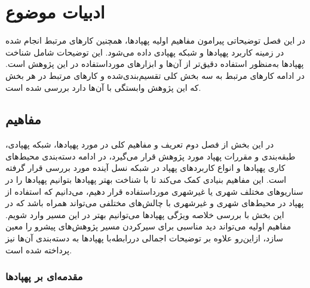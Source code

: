 \chapter{ادبیات موضوع}\label{Chapter2}
در این فصل توضیحاتی پیرامون مفاهیم اولیه پهپادها، همچنین کارهای مرتبط انجام شده در زمینه کاربرد پهپادها و شبکه پهپادی داده می‌شود. این توضیحات شامل شناخت پهپادها به‌منظور استفاده دقیق‌تر از آن‌ها و ابزارهای مورداستفاده در این پژوهش است. در ادامه کارهای مرتبط به سه بخش کلی تقسیم‌بندی‌شده و کارهای مرتبط در هر بخش که این پژوهش وابستگی با آن‌ها دارد بررسی شده است.
\section{مفاهیم} 

در این بخش از فصل دوم تعریف و مفاهیم کلی در مورد پهپادها، شبکه پهپادی، طبقه‌بندی و مقررات پهپاد مورد پژوهش قرار می‌گیرد، در ادامه دسته‌بندی محیط‌های کاری پهپادها و انواع کاربردهای پهپاد در شبکه نسل آینده مورد بررسی قرار گرفته است. این مفاهیم بنیادی کمک می‌کند تا با شناخت بهتر پهپادها بتوانیم پهپادها را در سناریوهای مختلف شهری یا غیرشهری مورداستفاده قرار دهیم، می‌دانیم که استفاده از پهپاد در محیط‌های شهری و غیرشهری با چالش‌های مختلفی می‌تواند همراه باشد که در این بخش با بررسی خلاصه ویژگی پهپادها می‌توانیم بهتر در این مسیر وارد شویم. مفاهیم اولیه می‌تواند دید مناسبی برای سیرکردن مسیر پژوهش‌های پیشرو را معین سازد، ازاین‌رو علاوه بر توضیحات اجمالی دررابطه‌با پهپادها به دسته‌بندی آن‌ها نیز پرداخته شده است.
\subsection{مقدمه‌ای بر پهپادها} 

